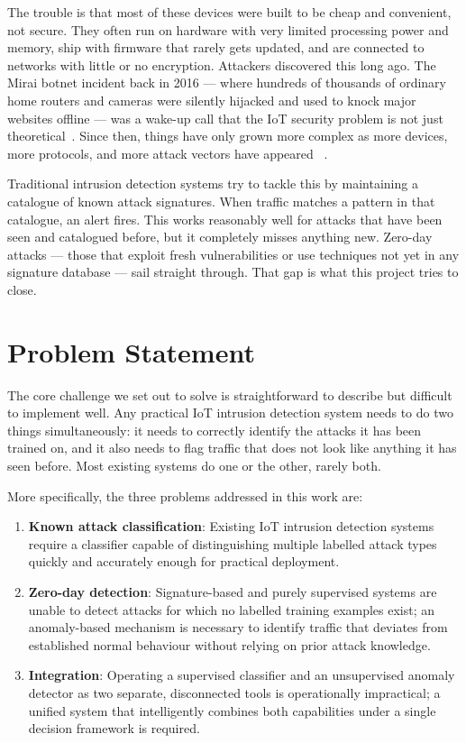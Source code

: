 \documentclass[12pt,a4paper]{report}
\begin{document}
\noindent The trouble is that most of these devices were built to be cheap and
convenient, not secure. They often run on hardware with very limited processing
power and memory, ship with firmware that rarely gets updated, and are connected
to networks with little or no encryption. Attackers discovered this long ago.
The Mirai botnet incident back in 2016 — where hundreds of thousands of ordinary
home routers and cameras were silently hijacked and used to knock major websites
offline — was a wake-up call that the IoT security problem is not just
theoretical~\cite{mirai_attack}. Since then, things have only grown more complex
as more devices, more protocols, and more attack vectors have appeared
~\cite{iot_security_challenges}.

\noindent Traditional intrusion detection systems try to tackle this by
maintaining a catalogue of known attack signatures. When traffic matches a
pattern in that catalogue, an alert fires. This works reasonably well for attacks
that have been seen and catalogued before, but it completely misses anything new.
Zero-day attacks — those that exploit fresh vulnerabilities or use techniques not
yet in any signature database — sail straight through. That gap is what this
project tries to close.

\section{Problem Statement}

The core challenge we set out to solve is straightforward to describe but
difficult to implement well. Any practical IoT intrusion detection system needs
to do two things simultaneously: it needs to correctly identify the attacks it
has been trained on, and it also needs to flag traffic that does not look like
anything it has seen before. Most existing systems do one or the other, rarely
both.

\noindent More specifically, the three problems addressed in this work are:
\begin{enumerate}
  \item \textbf{Known attack classification}: Existing IoT intrusion detection
        systems require a classifier capable of distinguishing multiple labelled
        attack types quickly and accurately enough for practical deployment.
  \item \textbf{Zero-day detection}: Signature-based and purely supervised systems
        are unable to detect attacks for which no labelled training examples exist;
        an anomaly-based mechanism is necessary to identify traffic that deviates
        from established normal behaviour without relying on prior attack knowledge.
  \item \textbf{Integration}: Operating a supervised classifier and an unsupervised
        anomaly detector as two separate, disconnected tools is operationally
        impractical; a unified system that intelligently combines both capabilities
        under a single decision framework is required.
\end{enumerate}
\end{document}
